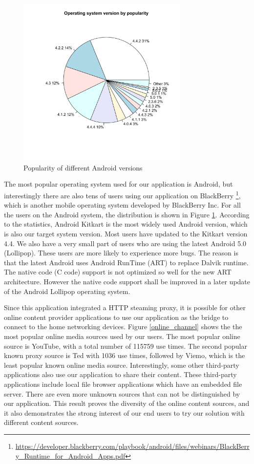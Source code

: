 \begin{figure}[!t]
\centering \includegraphics[height=8.5cm]{charts/os_version_popularity}
\caption{Popularity of different Android versions \label{os_versions}}
\end{figure}
The most popular operating system used for our application is Android, but
interestingly there are also tens of users using our application on
BlackBerry
\footnote{\url{https://developer.blackberry.com/playbook/android/files/webinars/BlackBerry_Runtime_for_Android_Apps.pdf}},
which is another mobile operating system developed by BlackBerry Inc.  For all
the users on the Android system, the distribution is shown in Figure
\ref{os_versions}. According to the statistics, Android Kitkart is the most
widely used Android version, which is also our target system version. Most
users have updated to the Kitkart version 4.4. We also have a very small part
of users who are using the latest Android 5.0 (Lollipop). These users are more
likely to experience more bugs. The reason is that the latest Android uses
Android RunTime (ART) to replace Dalvik runtime\cite{dalvik_arch}. The native
code (C code) support is not optimized so well for the new ART architecture.
However the native code support shall be improved in a later update of
the Android Lollipop operating system.

Since this application integrated a HTTP steaming proxy, it is possible for
other online content provider applications to use our application as the bridge
to connect to the home networking devices. Figure \ref{online_channel} shows the
the most popular online media sources used by our users. The most popular online source
is YouTube, with a total number of 115759 use times. The second popular known
proxy source is Ted with 1036 use times, followed by Viemo, which is the least popular
known online media source. Interestingly, some other third-party applications
also use our application to share their content. These third-party applications
include local file browser applications which have an embedded file server.
There are even more unknown sources that can not be distinguished by our application.
This result proves the diversity of the online content sources, and it also
demonstrates the strong interest of our end users to try our solution with
different content sources.

